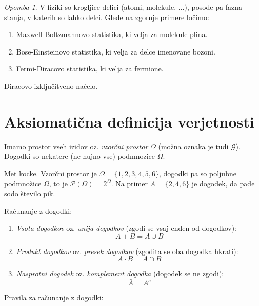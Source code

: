 \documentclass[12pt]{book}
\def\n{\noindent}
\theoremstyle{definition}
\theoremstyle{plain}
\theoremstyle{plain}
\theoremstyle{plain}
\theoremstyle{remark}
\newtheorem*{opomba}{Opomba}
\begin{document}
\begin{opomba}
V fiziki so krogljice delici (atomi, molekule, ...), posode pa fazna stanja, v katerih so lahko delci. Glede na zgornje primere ločimo:

\begin{enumerate}
    \item Maxwell-Boltzmannovo statistika, ki velja za molekule plina.
    \item Bose-Einsteinovo statistika, ki velja za delce imenovane bozoni.
    \item Fermi-Diracovo statistika, ki velja za fermione. 
\end{enumerate}

\n Diracovo izključitveno načelo.

\end{opomba}

\newpage

\chapter{Aksiomatična definicija verjetnosti}

Imamo prostor vseh izidov oz. \emph{vzorčni prostor} $\Omega$ (možna oznaka je tudi $\mathcal{G}$). Dogodki so nekatere (ne nujno vse) podmnozice $\Omega$.

\begin{zgled}
    Met kocke. Vzorčni prostor je $\Omega=\{1,2,3,4,5,6\}$, dogodki pa so poljubne podmnožice $\Omega$, to je $\mathcal{P}(\Omega) = 2^{\Omega}$. Na primer $A = \{2,4,6\}$ je dogodek, da pade sodo število pik. 
\end{zgled}

\n Računanje z dogodki:

\begin{enumerate}
    \item \emph{Vsota dogodkov} oz. \emph{unija dogodkov} (zgodi se vsaj enden od dogodkov): $$A + B = A \cup B$$
    \item \emph{Produkt dogodkov} oz. \emph{presek dogodkov} (zgodita se oba dogodka hkrati): $$A \cdot B = A \cap B$$
    \item \emph{Nasprotni dogodek} oz. \emph{komplement dogodka} (dogodek se ne zgodi): $$\bar A = A^c$$
\end{enumerate}

\n Pravila za računanje z dogodki: 
\end{document}
